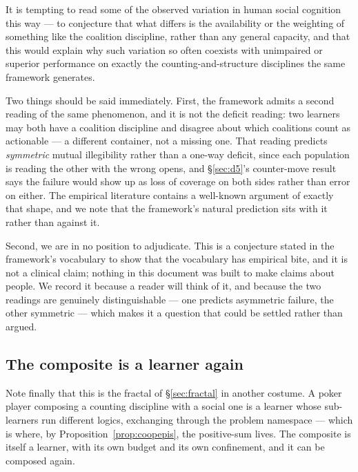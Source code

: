 \begin{remark}
\label{rem:autism}
It is tempting to read some of the observed variation in human social cognition
this way --- to conjecture that what differs is the availability or the weighting
of something like the coalition discipline, rather than any general capacity, and
that this would explain why such variation so often coexists with unimpaired or
superior performance on exactly the counting-and-structure disciplines the same
framework generates.

Two things should be said immediately. First, the framework admits a second
reading of the same phenomenon, and it is not the deficit reading: two learners
may both have a coalition discipline and disagree about which coalitions count as
actionable --- a different container, not a missing one. That reading predicts
\emph{symmetric} mutual illegibility rather than a one-way deficit, since each
population is reading the other with the wrong opens, and \S\ref{sec:d5}'s
counter-move result says the failure would show up as loss of coverage on both
sides rather than error on either. The empirical literature contains a well-known
argument of exactly that shape, and we note that the framework's natural
prediction sits with it rather than against it.

Second, we are in no position to adjudicate. This is a conjecture stated in the
framework's vocabulary to show that the vocabulary has empirical bite, and it is
not a clinical claim; nothing in this document was built to make claims about
people. We record it because a reader will think of it, and because the two
readings are genuinely distinguishable --- one predicts asymmetric failure, the
other symmetric --- which makes it a question that could be settled rather than
argued.
\end{remark}

\subsection{The composite is a learner again}

Note finally that this is the fractal of \S\ref{sec:fractal} in another costume. A
poker player composing a counting discipline with a social one is a learner whose
sub-learners run different logics, exchanging through the problem namespace ---
which is where, by Proposition~\ref{prop:coopepis}, the positive-sum lives. The
composite is itself a learner, with its own budget and its own confinement, and it
can be composed again.

